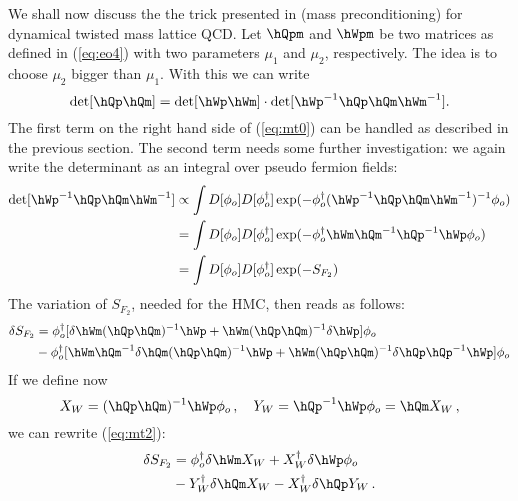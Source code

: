 
We shall now discuss the the trick presented in
\cite{Hasenbusch:2002ai} (mass preconditioning) for dynamical twisted
mass lattice QCD.
Let $\hQpm$ and $\hWpm$ be two matrices as defined in (\ref{eq:eo4})
with two parameters $\mu_1$ and $\mu_2$, respectively. The idea is to
choose $\mu_2$ bigger than $\mu_1$. With this we can
write
\begin{equation}
  \label{eq:mt0}
  \det[\hQp\hQm] = \det[\hWp\hWm]\cdot\det[\hWp^{-1}\hQp\hQm\hWm^{-1}].
\end{equation}
The first term on the right hand side of (\ref{eq:mt0}) can be handled
as described in the previous section. The second term needs some
further investigation: we again write the determinant as an integral
over pseudo fermion fields:
\begin{equation}
  \label{eq:mt1}
  \begin{split}
    \det[\hWp^{-1}\hQp\hQm\hWm^{-1}]  &\propto \int
    D[\phi_o]D[\phi_o^\dagger]\exp(-\phi_o^\dagger (\hWp^{-1}\hQp\hQm\hWm^{-1})^{-1}
    \phi_o) \\
    &= \int D[\phi_o]D[\phi_o^\dagger]\exp(-\phi_o^\dagger \hWm\hQm^{-1}\hQp^{-1}\hWp\phi_o) \\
    &= \int D[\phi_o]D[\phi_o^\dagger]\exp(-S_{F_2})
  \end{split}
\end{equation}
The variation of $S_{F_2}$, needed for the HMC, then reads as follows:
\begin{equation}
  \label{eq:mt2}
  \begin{split}
    \delta S_{F_2} &= \phi_o^\dagger[\delta\hWm(\hQp\hQm)^{-1}\hWp
    +\hWm(\hQp\hQm)^{-1}\delta\hWp]\phi_o\\
    &-\phi_o^\dagger[\hWm\hQm^{-1}\delta\hQm(\hQp\hQm)^{-1}\hWp +
    \hWm(\hQp\hQm)^{-1}\delta\hQp\hQp^{-1}\hWp]\phi_o
  \end{split}
\end{equation}
If we define now
\begin{equation}
  \label{eq:mt3}
  X_W = (\hQp\hQm)^{-1}\hWp\phi_o\, ,\quad Y_W = \hQp^{-1}\hWp\phi_o = \hQm
  X_W\, ,
\end{equation}
we can rewrite (\ref{eq:mt2}):
\begin{equation}
  \label{eq:mt4}
  \begin{split}
    \delta S_{F_2} &= \phi_o^\dagger\delta\hWm X_W + X_W^\dagger\delta\hWp\phi_o\\
    &-Y_W^\dagger\delta\hQm X_W - X_W^\dagger\delta\hQp Y_W\, .
  \end{split}
\end{equation}
